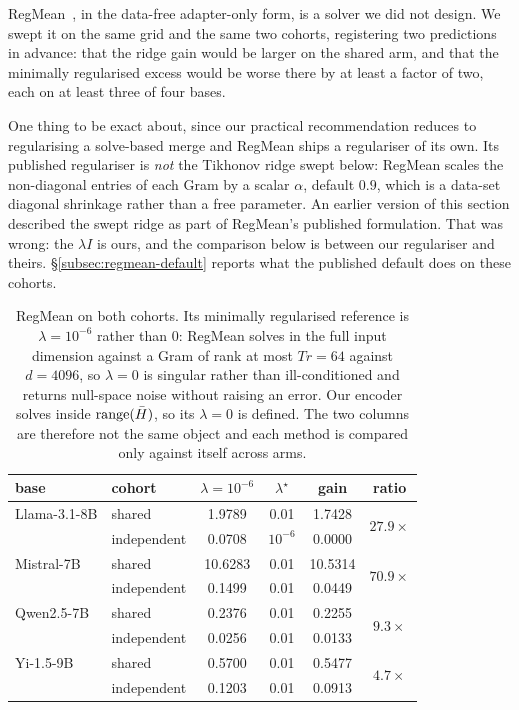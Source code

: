 RegMean~\citep{jin2023regmean}, in the data-free adapter-only form, is a
solver we did not design. We swept it on the same grid and the same two
cohorts, registering two predictions in advance: that the ridge gain would
be larger on the shared arm, and that the minimally regularised excess
would be worse there by at least a factor of two, each on at least three of
four bases.

One thing to be exact about, since our practical recommendation reduces to
regularising a solve-based merge and RegMean ships a regulariser of its
own. Its published regulariser is \emph{not} the Tikhonov ridge swept
below: RegMean scales the non-diagonal entries of each Gram by a scalar
$\alpha$, default $0.9$, which is a data-set diagonal shrinkage rather than
a free parameter. An earlier version of this section described the swept
ridge as part of RegMean's published formulation. That was wrong: the
$\lambda I$ is ours, and the comparison below is between our regulariser
and theirs. \S\ref{subsec:regmean-default} reports what the published
default does on these cohorts.

\begin{table}[t]
\centering
\small
\caption{RegMean on both cohorts. Its minimally regularised reference is
$\lambda = 10^{-6}$ rather than $0$: RegMean solves in the full input
dimension against a Gram of rank at most $Tr = 64$ against $d = 4096$, so
$\lambda = 0$ is singular rather than ill-conditioned and returns
null-space noise without raising an error. Our encoder solves inside
$\operatorname{range}(\bar H)$, so its $\lambda = 0$ is defined. The two columns are
therefore not the same object and each method is compared only against
itself across arms.}
\label{tab:regmean}
\begin{tabular}{llcccc}
\toprule
base & cohort & $\lambda = 10^{-6}$ & $\lambda^\star$ & gain & ratio \\
\midrule
Llama-3.1-8B & shared      & 1.9789 & 0.01 & 1.7428 & \multirow{2}{*}{$27.9\times$} \\
             & independent & 0.0708 & $10^{-6}$ & 0.0000 & \\
\addlinespace
Mistral-7B   & shared      & 10.6283 & 0.01 & 10.5314 & \multirow{2}{*}{$70.9\times$} \\
             & independent & 0.1499 & 0.01 & 0.0449 & \\
\addlinespace
Qwen2.5-7B   & shared      & 0.2376 & 0.01 & 0.2255 & \multirow{2}{*}{$9.3\times$} \\
             & independent & 0.0256 & 0.01 & 0.0133 & \\
\addlinespace
Yi-1.5-9B    & shared      & 0.5700 & 0.01 & 0.5477 & \multirow{2}{*}{$4.7\times$} \\
             & independent & 0.1203 & 0.01 & 0.0913 & \\
\bottomrule
\end{tabular}
\end{table}

